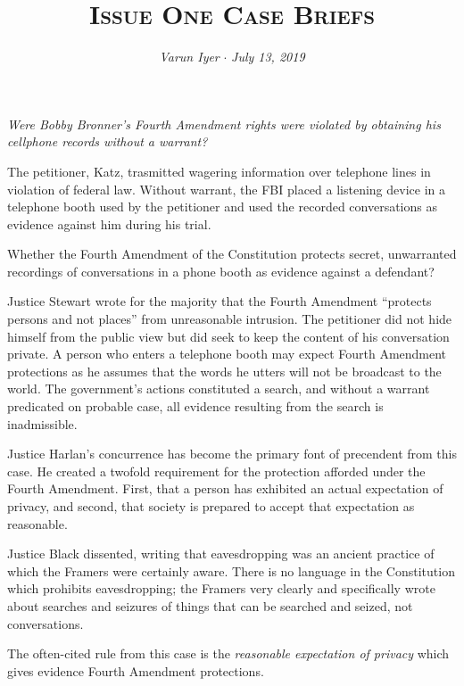 \documentclass[paper=letter,fontsize=10pt]{article}
\title{\textsc{Issue One Case Briefs}}
\date{}
\author{\textit{Varun Iyer} \hspace{.5em} $\cdot$ \hspace{.5em} \textit{July 13, 2019}}
\newcommand{\case}[3]{\noindent {\large\textbf{\textit{#1}, #2 (#3)}} \par}
\begin{document}
\maketitle
\begin{center} 
	\textit{Were Bobby Bronner’s Fourth Amendment rights were violated by
	obtaining his cellphone records without a warrant?}
\end{center}
\case{Katz v. United States}{389 U.S. 347}{1967}
	\begin{description}[align=right]
		\item[Facts] \noindent
			The petitioner, Katz, trasmitted wagering information over telephone lines in violation of federal law. Without warrant, the FBI placed a listening device in a telephone booth used by the petitioner and used the recorded conversations as evidence against him during his trial.
		\item[Issue] \noindent
			Whether the Fourth Amendment of the Constitution protects secret, unwarranted recordings of conversations in a phone booth as evidence against a defendant?
		\item[Holding] \noindent 
			Justice Stewart wrote for the majority that the Fourth Amendment “protects persons and not places” from unreasonable intrusion.
			The petitioner did not hide himself from the public view but did seek to keep the content of his conversation private. 
			A person who enters a telephone booth may expect Fourth Amendment protections as he assumes that the words he utters will not be broadcast to the world. 
			The government’s actions constituted a search, and without a warrant predicated on probable case, all evidence resulting from the search is inadmissible.
		\item[Concurrence] \noindent
			Justice Harlan’s concurrence has become the primary font of precendent from this case. 
			He created a twofold requirement for the protection afforded under the Fourth Amendment. 
			First, that a person has exhibited an actual expectation of privacy, and second, that society is prepared to accept that expectation as reasonable.
		\item[Dissent] \noindent
			Justice Black dissented, writing that eavesdropping was an ancient practice of which the Framers were certainly aware.
			There is no language in the Constitution which prohibits eavesdropping; the Framers very clearly and specifically wrote about searches and seizures of things that can be searched and seized, not conversations.
		\item[Rules] \noindent
			The often-cited rule from this case is the \textit{reasonable expectation of privacy} which gives evidence Fourth Amendment protections.
	\end{description}
\end{document}
